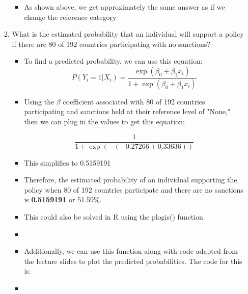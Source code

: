 \documentclass[12pt,letterpaper]{article}
\begin{document}
\begin{enumerate}
\begin{enumerate}
\begin{itemize}
\item As shown above, we get approximately the same answer as if we change the reference category




















		\end{itemize}
		\item
		What is the estimated probability that an individual will support a policy if there are 80 of 192 countries participating with no sanctions?
		\begin{itemize}
		\item To find a predicted probability, we can use this equation:
		\[
		P(Y_i = 1 | X_i) = \frac{\exp(\beta_0 + \beta_1 x_i)}{1 + \exp(\beta_0 + \beta_1 x_i)}
		\]
		
		\item Using the $\beta$ coefficient associated with 80 of 192 countries participating and sanctions held at their reference level of "None," then we can plug in the values to get this equation:
		
		\[
		\frac{1}{1 + \exp\left(-(-0.27266 + 0.33636)\right)}
		\]
		
		\item This simplifies to 0.5159191
		\item Therefore, the estimated probability of an individual supporting the policy when 80 of 192 countries participate and there are no sanctions is \textbf{0.5159191} or 51.59\%.
		
		\item This could also be solved in R using the plogis() function
		\item 
		
		\vspace{0.1cm}
		\item Additionally, we can use this function along with code adapted from the lecture slides to plot the predicted probabilities. The code for this is:
		\item 
		

\end{itemize}
\end{enumerate}
\end{enumerate}
\end{document}
